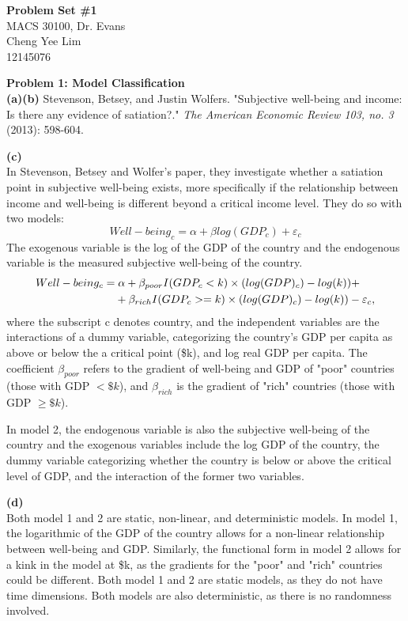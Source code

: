 \documentclass[letterpaper,12pt]{article}
\theoremstyle{definition}
\begin{document}
\begin{flushleft}
  \textbf{\large{Problem Set \#1}} \\
  MACS 30100, Dr. Evans \\
  Cheng Yee Lim\\
  12145076
\end{flushleft}

\vspace{5mm}

\noindent \textbf{Problem 1: Model Classification}\\
\textbf{(a)(b)}
\flushleft Stevenson, Betsey, and Justin Wolfers. "Subjective well-being and income: Is there any evidence of satiation?." \textit{The American Economic Review 103, no. 3 }(2013): 598-604.

\flushleft \textbf{(c)}\\
In Stevenson, Betsey and Wolfer's paper, they investigate whether a satiation point in subjective well-being exists, more specifically if the relationship between income and well-being is different beyond a critical income level. They do so with two models:
\begin{equation}
	Well-being_{c}=\alpha+\beta log(GDP_c)+\varepsilon_{c}
\end{equation}
\flushleft The exogenous variable is the log of the GDP of the country and the endogenous variable is the measured subjective well-being of the country.
\begin{align}
	Well-being_{c}&=\alpha+\beta_{poor}I(GDP_{c}<k)\times(log(GDP)_c) - log(k))+ \notag\\
&\phantom{{}=}{}+{}\beta_{rich}I(GDP_{c}>=k)\times(log(GDP)_c) - log(k))-\varepsilon_{c},
\end{align}
where the subscript c denotes country, and the independent variables are the interactions of a dummy variable, categorizing the country's GDP per capita as above or below the a critical point (\$k), and log real GDP per capita. The coefficient $\beta_{poor}$ refers to the gradient of well-being and GDP of "poor" countries (those with GDP $<\$k$), and $\beta_{rich}$ is the gradient of "rich" countries (those with GDP $\geqslant \$k$).

\flushleft In model 2, the endogenous variable is also the subjective well-being of the country and the exogenous variables include the log GDP of the country, the dummy variable categorizing whether the country is below or above the critical level of GDP, and the interaction of the former two variables. 

\flushleft \textbf{(d)}\\
Both model 1 and 2 are static, non-linear, and deterministic models. In model 1, the logarithmic of the GDP of the country allows for a non-linear relationship between well-being and GDP. Similarly, the functional form in model 2 allows for a kink in the model at \$k, as the gradients for the "poor" and "rich" countries could be different. Both model 1 and 2 are static models, as they do not have time dimensions. Both models are also deterministic, as there is no randomness involved.  
\end{document}
